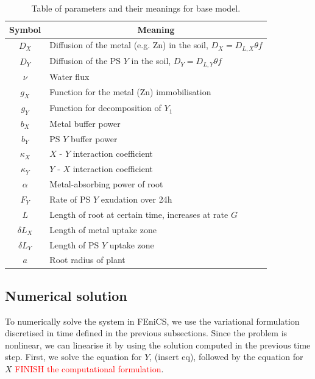 \documentclass[11pt]{article}
\begin{document}
\begin{table}[!htb]
\begin{center}
\fontsize{9.5}{7}\selectfont
\setlength{\tabcolsep}{5.pt}
\def\arraystretch{2.0}
\begin{tabular}{cl}
\toprule
    \bf Symbol & \multicolumn{1}{c}{\bf Meaning}
    \\ \midrule
    $D_X$ & Diffusion of the metal (e.g. Zn) in the soil, $D_X = D_{L,X} \theta f$  \\  
	$D_{Y}$ &  Diffusion of the PS $Y$ in the soil, $D_{Y} = D_{L,Y} \theta f$  \\ 
	$\nu$ & Water flux\\
	$g_X$ & Function for the metal (Zn) immobilisation \\
	$g_{Y}$ & Function for decomposition of $Y_1$ \\
	$b_X$ & Metal buffer power \\
	$b_{Y}$ & PS $Y$ buffer power \\
	$\kappa_{X}$ & $X$ - $Y$ interaction coefficient \\
	$\kappa_{Y}$ & $Y$ - $X$ interaction coefficient\\
	$\alpha $ & Metal-absorbing power of root \\
	$F_{Y} $ & Rate of PS $Y$ exudation over 24h \\
	$L$ & Length of root at certain time, increases at rate $G$ \\
	$\delta L_{X}$ & Length of metal uptake zone \\
	$\delta L_{Y}$ & Length of PS $Y$ uptake zone  \\	
	$a$ & Root radius of plant \\
\bottomrule
\end{tabular}
\caption{Table of parameters and their meanings for base model.
\label{t:First-model-params}}
\end{center}
\end{table}








\subsection{Numerical solution}
To numerically solve the system in FEniCS, we use the variational formulation discretised in time defined in the previous subsections. Since the problem is nonlinear, we can linearise it by using the solution computed in the previous time step. First, we solve the equation for $Y$, (insert eq), followed by the equation for $X$ \textcolor{red}{FINISH the computational formulation}.
\end{document}
